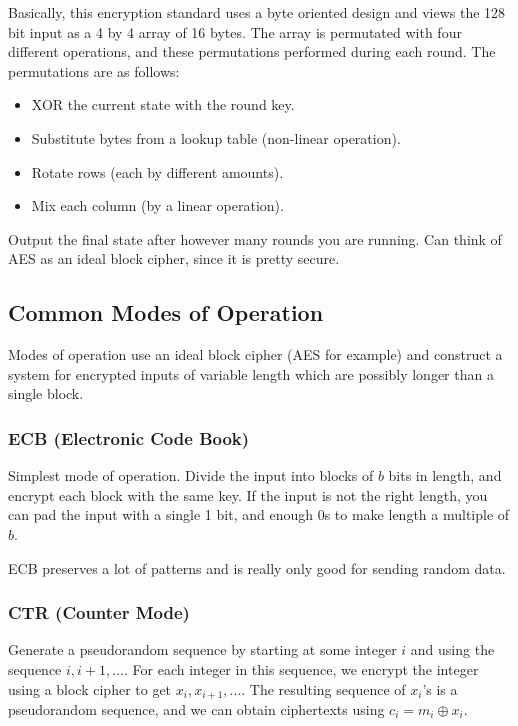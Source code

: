 \documentclass[psamsfonts]{amsart}
\begin{document}
Basically, this encryption standard uses a byte oriented design and views the 128 bit input as a 4 by 4 array of 16 bytes. The array is permutated with four different operations, and these permutations performed during each round. The permutations are as follows:
\begin{itemize}
  \item XOR the current state with the round key.
  \item Substitute bytes from a lookup table (non-linear operation).
  \item Rotate rows (each by different amounts).
  \item Mix each column (by a linear operation).
\end{itemize}

Output the final state after however many rounds you are running. Can think of AES as an ideal block cipher, since it is pretty secure.

\subsection{Common Modes of Operation}

Modes of operation use an ideal block cipher (AES for example) and construct a system for encrypted inputs of variable length which are possibly longer than a single block.

\subsubsection{ECB (Electronic Code Book)}

Simplest mode of operation. Divide the input into blocks of $b$ bits in length, and encrypt each block with the same key. If the input is not the right length, you can pad the input with a single 1 bit, and enough 0s to make length a multiple of $b$.

ECB preserves a lot of patterns and is really only good for sending random data.

\subsubsection{CTR (Counter Mode)}

Generate a pseudorandom sequence by starting at some integer $i$ and using the sequence $i, i+1, \ldots$. For each integer in this sequence, we encrypt the integer using a block cipher to get $x_i, x_{i+1}, \ldots$. The resulting sequence of $x_i$'s is a pseudorandom sequence, and we can obtain ciphertexts using $c_i = m_i \oplus x_i$.
\end{document}
